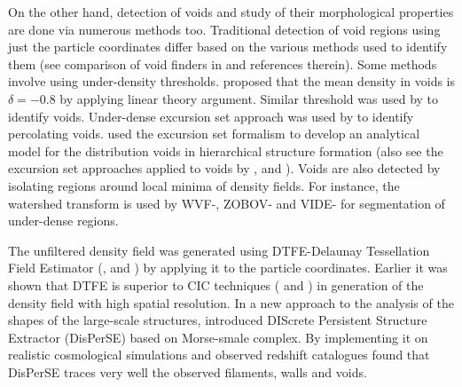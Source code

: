 \documentclass[fleqn,usenatbib,useAMS]{mnras}
\begin{document}
On the other hand, detection of voids and study of their morphological properties are done via numerous methods too. Traditional detection of void regions using just the particle coordinates differ based on the various methods used to identify them (see comparison of void finders in \citealt{Colberg2008} and references therein). Some methods involve using under-density thresholds. \cite{Blumenthal1992} proposed that the mean density in voids is $\delta = -0.8$ by applying linear theory argument. Similar threshold was used by \cite{Colberg2005} to identify voids. Under-dense excursion set approach was used by \cite{Shandarin2006} to identify percolating voids. \cite{Sheth2004a} used the excursion set formalism to develop an analytical model for the distribution voids in hierarchical structure formation (also see the excursion set approaches applied to voids by \citealt{Paranjape2012}, \citealt{Jennings2013} and \citealt{Achitouv2015}). Voids are also detected by isolating regions around local minima of density fields. For instance, the watershed transform is used by WVF-\cite{Platen2007},  ZOBOV-\cite{Neyrinck2008} and VIDE-\cite{Sutter2015} for segmentation of under-dense regions. 


The unfiltered density field was generated using DTFE-Delaunay Tessellation Field Estimator (\citealt{Schaap2000}, \citealt{Weygaert2009a} and \citealt{Cautun2011}) by applying it to the particle coordinates. Earlier it was shown that DTFE is superior to CIC techniques (\citealt{Schaap2007} and \citealt{Weygaert2009a}) in generation of the density field with high spatial resolution. In a new approach to the analysis of the shapes of the large-scale structures, \cite{Sousbie2011a} introduced DIScrete Persistent Structure Extractor ({DisPerSE}) based on Morse-smale complex. By implementing it on realistic cosmological simulations and observed redshift catalogues \cite{Sousbie2011e} found that DisPerSE traces very well the observed filaments, walls and voids.
\end{document}
